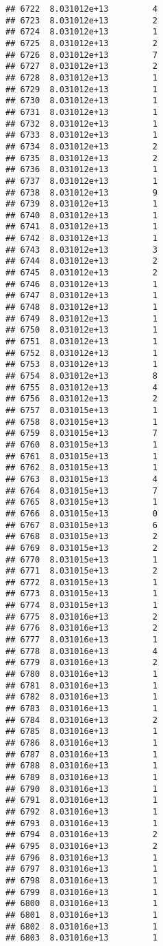 \documentclass[
]{article}
\begin{document}
\begin{verbatim}
## 6722  8.031012e+13         4
## 6723  8.031012e+13         2
## 6724  8.031012e+13         1
## 6725  8.031012e+13         2
## 6726  8.031012e+13         7
## 6727  8.031012e+13         2
## 6728  8.031012e+13         1
## 6729  8.031012e+13         1
## 6730  8.031012e+13         1
## 6731  8.031012e+13         1
## 6732  8.031012e+13         1
## 6733  8.031012e+13         1
## 6734  8.031012e+13         2
## 6735  8.031012e+13         2
## 6736  8.031012e+13         1
## 6737  8.031012e+13         1
## 6738  8.031012e+13         9
## 6739  8.031012e+13         1
## 6740  8.031012e+13         1
## 6741  8.031012e+13         1
## 6742  8.031012e+13         1
## 6743  8.031012e+13         3
## 6744  8.031012e+13         2
## 6745  8.031012e+13         2
## 6746  8.031012e+13         1
## 6747  8.031012e+13         1
## 6748  8.031012e+13         1
## 6749  8.031012e+13         1
## 6750  8.031012e+13         1
## 6751  8.031012e+13         1
## 6752  8.031012e+13         1
## 6753  8.031012e+13         1
## 6754  8.031012e+13         8
## 6755  8.031012e+13         4
## 6756  8.031012e+13         2
## 6757  8.031015e+13         1
## 6758  8.031015e+13         1
## 6759  8.031015e+13         7
## 6760  8.031015e+13         1
## 6761  8.031015e+13         1
## 6762  8.031015e+13         1
## 6763  8.031015e+13         4
## 6764  8.031015e+13         7
## 6765  8.031015e+13         1
## 6766  8.031015e+13         0
## 6767  8.031015e+13         6
## 6768  8.031015e+13         2
## 6769  8.031015e+13         2
## 6770  8.031015e+13         1
## 6771  8.031015e+13         2
## 6772  8.031015e+13         1
## 6773  8.031015e+13         1
## 6774  8.031015e+13         1
## 6775  8.031016e+13         2
## 6776  8.031016e+13         2
## 6777  8.031016e+13         1
## 6778  8.031016e+13         4
## 6779  8.031016e+13         2
## 6780  8.031016e+13         1
## 6781  8.031016e+13         1
## 6782  8.031016e+13         1
## 6783  8.031016e+13         1
## 6784  8.031016e+13         2
## 6785  8.031016e+13         1
## 6786  8.031016e+13         1
## 6787  8.031016e+13         1
## 6788  8.031016e+13         1
## 6789  8.031016e+13         1
## 6790  8.031016e+13         1
## 6791  8.031016e+13         1
## 6792  8.031016e+13         1
## 6793  8.031016e+13         1
## 6794  8.031016e+13         2
## 6795  8.031016e+13         2
## 6796  8.031016e+13         1
## 6797  8.031016e+13         1
## 6798  8.031016e+13         1
## 6799  8.031016e+13         1
## 6800  8.031016e+13         1
## 6801  8.031016e+13         1
## 6802  8.031016e+13         1
## 6803  8.031016e+13         1

\end{verbatim}
\end{document}
